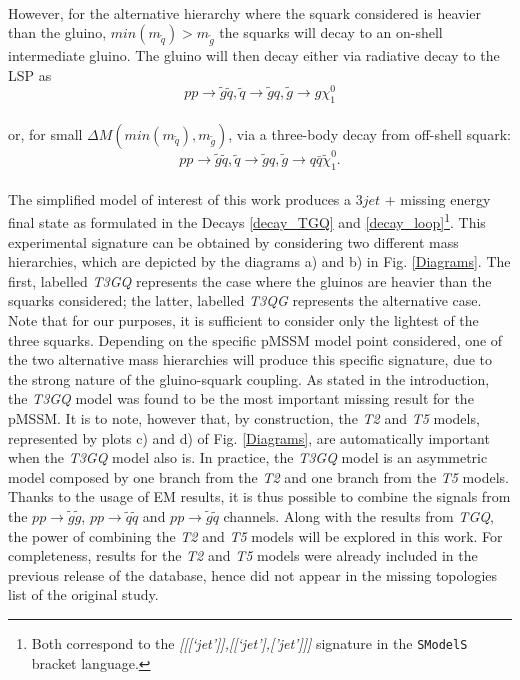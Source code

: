 \documentclass[a4paper,11pt]{article}
\newcommand{\SMO}{\texttt{SModelS\xspace}}
\begin{document}
\\
However, for the alternative hierarchy where the squark considered is heavier than the gluino,  $ min(m_{\tilde q}) > m_{\tilde g}$ the squarks will decay to an on-shell intermediate gluino. The gluino will then decay either via radiative decay to the LSP as 
\begin{equation}\label{decay_loop}
p p \rightarrow \tilde g \tilde q ,\tilde q \rightarrow \tilde g q , \tilde g \rightarrow g \chi_1 ^0
\end{equation} 
\\
or, for small $\Delta M(min(m_{\tilde q}), m_{\tilde g})$,  via a three-body decay from off-shell squark:
\begin{equation}
p p \rightarrow \tilde g \tilde q ,\tilde q \rightarrow \tilde g q, \tilde g \rightarrow q \bar q \tilde \chi _1 ^0.
\end{equation}
\\
The simplified model of interest of this work produces a $3jet$ + missing energy final state as formulated in the Decays \ref{decay_TGQ} and \ref{decay_loop}\footnote{Both correspond to the \textit{[[[`jet']],[[`jet'],['jet']]]} signature in the \SMO~ bracket language.}. This experimental signature can be obtained by considering two different mass hierarchies, which are depicted by the diagrams a) and b) in Fig. \ref{Diagrams}. The first, labelled \textit{T3GQ} represents the case where the gluinos are heavier than the squarks considered; the latter, labelled \textit{T3QG} represents the alternative case. Note that for our purposes, it is sufficient to consider only the lightest of the three squarks. Depending on the specific pMSSM model point considered, one of the two alternative mass hierarchies will produce this specific signature, due to the strong nature of the gluino-squark coupling.
%
As stated in the introduction, the \textit{T3GQ} model was found to be the most important missing result for the pMSSM. It is to note, however that, by construction, the \textit{T2} and \textit{T5} models, represented by plots c) and d) of Fig. \ref{Diagrams}, are automatically important when the \textit{T3GQ} model also is. In practice, the \textit{T3GQ} model is an asymmetric model composed by one branch from the \textit{T2} and one branch from the \textit{T5} models. Thanks to the usage of EM results, it is thus possible to combine the signals from the $pp \rightarrow \tilde g \tilde g$, $pp \rightarrow \tilde q \tilde q$ and $pp \rightarrow \tilde g \tilde q$ channels. Along with the results from \textit{TGQ}, the power of combining the \textit{T2} and \textit{T5} models will be explored in this work. For completeness, results for the \textit{T2} and \textit{T5} models were already included in the previous release of the database, hence did not appear in the missing topologies list of the original study. 
\end{document}
